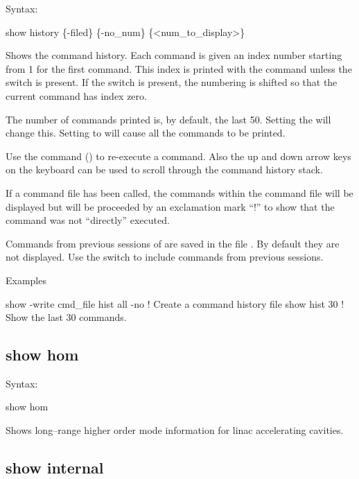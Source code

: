 {{{{{{{{Syntax:
\begin{example}
  show history \{-filed\} \{-no_num\} \{<num_to_display>\}
\end{example}

Shows the command history. Each command is given an index number starting from 1 for the first
command. This index is printed with the command unless the  switch is present. If the
 switch is present, the numbering is shifted so that the current  command
has index zero.

The number of commands printed is, by default, the last 50. Setting the  will
change this. Setting  to   will cause all the commands to be printed.

Use the command  () to re-execute a command. Also the up and down
arrow keys on the keyboard can be used to scroll through the command history stack.

If a command file has been called, the commands within the command file will be displayed but will
be proceeded by an exclamation mark ``!'' to show that the command was not ``directly'' executed.

Commands from previous sessions of \tao are saved in the file . By default they
are not displayed. Use the  switch to include commands from previous sessions.

Examples
\begin{example}
  show -write cmd_file hist all -no   ! Create a command history file
  show hist 30                        ! Show the last 30 commands.
\end{example}


\subsection{show hom}
\label{s:show.hom}

Syntax:
\begin{example}
  show hom
\end{example}

Shows long--range higher order mode information for linac accelerating
cavities.


\subsection{show internal}
\label{s:show.internal}

}}}}}}}}
